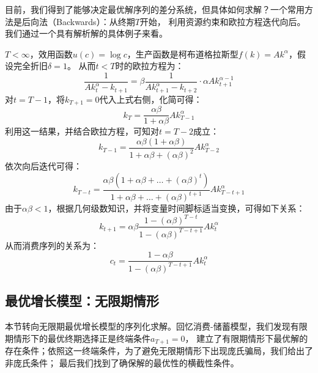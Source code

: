目前，我们得到了能够决定最优解序列的差分系统，但具体如何求解？一个常用方法是后向法（Backwards）：从终期$T$开始，
利用资源约束和欧拉方程迭代向后。我们通过一个具有解析解的具体例子来看。
\begin{example}
    $T<\infty$，效用函数$u(c) = \log c$，生产函数是柯布道格拉斯型$f(k) = Ak^{\alpha}$，假设完全折旧$\delta = 1$。
    从而$t<T$时的欧拉方程为：
    \begin{equation*}
        \frac{1}{A k_t^\alpha-k_{t+1}}=\beta \frac{1}{A k_{t+1}^\alpha-k_{t+2}} \cdot \alpha A k_{t+1}^{\alpha-1}
    \end{equation*}
    对$t=T-1$，将$k_{T+1}=0$代入上式右侧，化简可得：
    \begin{equation*}
        k_T=\frac{\alpha \beta}{1+\alpha \beta} A k_{T-1}^\alpha
    \end{equation*}
    利用这一结果，并结合欧拉方程，可知对$t=T-2$成立：
    \begin{equation*}
        k_{T-1}=\frac{\alpha \beta(1+\alpha \beta)}{1+\alpha \beta+(\alpha \beta)^2} A k_{T-2}^\alpha
    \end{equation*}
    依次向后迭代可得：
    \begin{equation*}
        k_{T-t} = \frac{\alpha \beta\left(1+\alpha \beta+\ldots+(\alpha \beta)^t\right)}
            {1+\alpha \beta+\ldots+(\alpha \beta)^{t+1}} A k_{T-t+1}^\alpha
    \end{equation*}
    由于$\alpha\beta<1$，根据几何级数知识，并将变量时间脚标适当变换，可得如下关系：
    \begin{equation*}
        k_{t+1}=\alpha \beta \frac{1-(\alpha \beta)^{T-t}}{1-(\alpha \beta)^{T-t+1}} A k_t^\alpha
    \end{equation*}
    从而消费序列的关系为：
    \begin{equation*}
        c_t=\frac{1-\alpha \beta}{1-(\alpha \beta)^{T-t+1}} A k_t^\alpha
    \end{equation*}
\end{example}


\subsection{最优增长模型：无限期情形} \label{subsec-rck-infinite}

本节转向无限期最优增长模型的序列化求解。回忆消费-储蓄模型，我们发现有限期情形下的最优终期选择正是终端条件$a_{T+1}=0$，
建立了有限期情形下最优解的存在条件；依照这一终端条件，为了避免无限期情形下出现庞氏骗局，我们给出了非庞氏条件；
最后我们找到了确保解的最优性的横截性条件。

